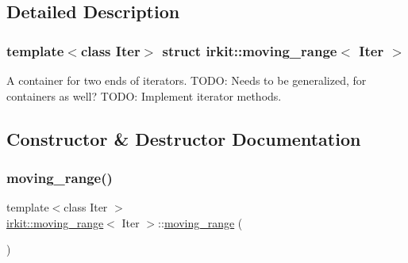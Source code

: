 \subsection{Detailed Description}
\subsubsection*{template$<$class Iter$>$\newline
struct irkit\+::moving\+\_\+range$<$ Iter $>$}

A container for two ends of iterators. T\+O\+DO\+: Needs to be generalized, for containers as well? T\+O\+DO\+: Implement iterator methods. 

\subsection{Constructor \& Destructor Documentation}
\mbox{\label{structirkit_1_1moving__range_a9b6d474c670875034ca5a044b0a2fc14}} 
\subsubsection{\texorpdfstring{moving\+\_\+range()}{moving\_range()}\hspace{0.1cm}{\footnotesize\ttfamily [1/2]}}
{\footnotesize\ttfamily template$<$class Iter $>$ \\
\mbox{\hyperlink{structirkit_1_1moving__range}{irkit\+::moving\+\_\+range}}$<$ Iter $>$\+::\mbox{\hyperlink{structirkit_1_1moving__range}{moving\+\_\+range}} (\begin{DoxyParamCaption}{ }\end{DoxyParamCaption})\hspace{0.3cm}{\ttfamily [default]}}

\mbox{\label{structirkit_1_1moving__range_a79a261cc6e7da7ffb0d93a198fe3dab7}} 
